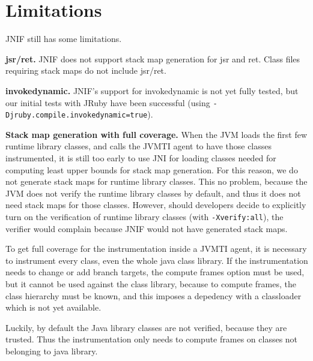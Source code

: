 \section{Limitations}
\label{sec:jnif-limitations}

JNIF still has some limitations.

\textbf{jsr/ret.} JNIF does not support stack map generation for jsr and ret.
Class files requiring stack maps do not include jsr/ret.

\textbf{invokedynamic.} JNIF's support for invokedynamic is not yet fully tested, 
but our initial tests with JRuby have been successful
(using \texttt{-Djruby.compile.invokedynamic=true}).

\textbf{Stack map generation with full coverage.}
When the JVM loads the first few runtime library classes,
and calls the JVMTI agent to have those classes instrumented,
it is still too early to use JNI for loading classes needed for computing least upper bounds for stack map generation.
For this reason, we do not generate stack maps for runtime library classes.
This no problem, because the JVM does not verify the runtime library classes by default,
and thus it does not need stack maps for those classes.
However, should developers decide to explicitly turn on the verification of runtime library classes
(with \verb|-Xverify:all|), the verifier would complain because JNIF would not have generated stack maps.


To get full coverage for the instrumentation inside a JVMTI agent, 
it is necessary to instrument every class, 
even the whole java class library.
If the instrumentation needs to change or add branch targets, 
the compute frames option must be used, 
but it cannot be used against the class library,
because to compute frames, 
the class hierarchy must be known, and 
this imposes a depedency with a classloader which is not yet available.

Luckily, by default the Java library classes are not verified, because they are trusted. 
Thus the instrumentation only needs to compute frames on classes not belonging to java library.

